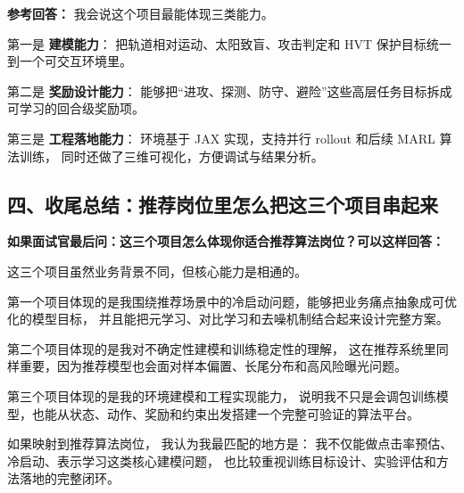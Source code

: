 \documentclass[11pt,a4paper]{ctexart}
\begin{document}
\begin{enumerate}[leftmargin=*, label=\textbf{Q\arabic*.}]
\textbf{参考回答：}
我会说这个项目最能体现三类能力。

第一是 \textbf{建模能力}：
把轨道相对运动、太阳致盲、攻击判定和 HVT 保护目标统一到一个可交互环境里。

第二是 \textbf{奖励设计能力}：
能够把“进攻、探测、防守、避险”这些高层任务目标拆成可学习的回合级奖励项。

第三是 \textbf{工程落地能力}：
环境基于 JAX 实现，支持并行 rollout 和后续 MARL 算法训练，
同时还做了三维可视化，方便调试与结果分析。

\end{enumerate}

\subsection*{四、收尾总结：推荐岗位里怎么把这三个项目串起来}

\textbf{如果面试官最后问：这三个项目怎么体现你适合推荐算法岗位？可以这样回答：}

这三个项目虽然业务背景不同，但核心能力是相通的。

第一个项目体现的是我围绕推荐场景中的冷启动问题，能够把业务痛点抽象成可优化的模型目标，
并且能把元学习、对比学习和去噪机制结合起来设计完整方案。

第二个项目体现的是我对不确定性建模和训练稳定性的理解，
这在推荐系统里同样重要，因为推荐模型也会面对样本偏置、长尾分布和高风险曝光问题。

第三个项目体现的是我的环境建模和工程实现能力，
说明我不只是会调包训练模型，也能从状态、动作、奖励和约束出发搭建一个完整可验证的算法平台。

如果映射到推荐算法岗位，
我认为我最匹配的地方是：
我不仅能做点击率预估、冷启动、表示学习这类核心建模问题，
也比较重视训练目标设计、实验评估和方法落地的完整闭环。
\end{document}
